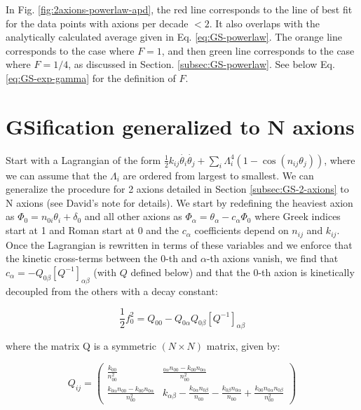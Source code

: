 \documentclass[11pt]{article}
\begin{document}
In Fig. \ref{fig:2axions-powerlaw-apd}, the red line corresponds to the line of best fit for the data points with axions per decade $<2$. It also overlaps with the analytically calculated average given in Eq. \eqref{eq:GS-powerlaw}. The orange line corresponds to the case where $F=1$, and then green line corresponds to the case where $F=1/4$, as discussed in Section. \ref{subsec:GS-powerlaw}. See below Eq. \eqref{eq:GS-exp-gamma} for the definition of $F$. 

\section{GSification generalized to N axions}
\label{subsec:general-GS}

Start with a Lagrangian of the form $\frac12k_{ij}\dot{\theta_i}\dot{\theta_j}+\sum_i\Lambda_i^4(1-\cos{(n_{ij}\theta_j)})$, where we can assume that the $\Lambda_i$ are ordered from largest to smallest. We can generalize the procedure for 2 axions  detailed in Section \ref{subsec:GS-2-axions} to N axions (see David's note for details). We start by redefining the heaviest axion as $\Phi_0 = n_{0i}\theta_i + \delta_0 $ and all other axions as $\Phi_\alpha = \theta_\alpha - c_\alpha\Phi_0 $ where Greek indices start at 1 and Roman start at 0 and the $c_\alpha$ coefficients depend on $n_{ij}$ and $k_{ij}$. Once the Lagrangian is rewritten in terms of these variables and we enforce that the kinetic cross-terms between the 0-th and $\alpha$-th axions vanish, we find that $c_\alpha = - Q_{0\beta}[Q^{-1}]_{\alpha\beta}$ (with $Q$ defined below) and that the 0-th axion is kinetically decoupled from the others with a decay constant:

\begin{equation}
    \label{eq:new-decay-constant}
    \frac{1}{2}f_0^2 = Q_{00} - Q_{0\alpha}Q_{0\beta}[Q^{-1}]_{\alpha\beta}
\end{equation}

\noindent where the matrix Q is a symmetric $(N\times N)$ matrix, given by:

\begin{equation}
    \label{eq:Q}
    Q_{ij} = \begin{pmatrix}
        \frac{k_{00}}{n_{00}^2} & \frac{_{0\alpha}n_{00}-k_{00}n_{0\alpha}}{n_{00}^2} \\
         \frac{k_{0\alpha}n_{00}-k_{00}n_{0\alpha}}{n_{00}^2} & k_{\alpha\beta} - \frac{k_{0\alpha}n_{0\beta}}{n_{00}} - \frac{k_{0\beta}n_{0\alpha}}{n_{00}} + \frac{k_{00} n_{0\alpha}n_{0\beta}}{n_{00}^2}
    \end{pmatrix}
\end{equation}
\end{document}
